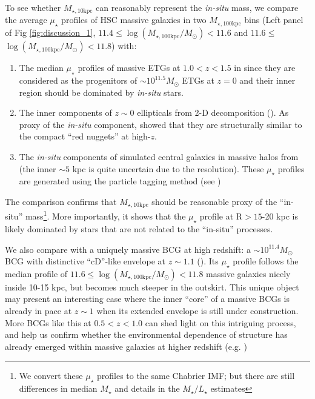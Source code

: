 \documentclass[a4paper,fleqn,usenatbib]{mnras}
\def\mstar{{$M_{\star}$}}
\def\minn{{$M_{\star,10\mathrm{kpc}}$}}
\def\mtot{{$M_{\star,100\mathrm{kpc}}$}}
\def\logmtot{{$\log (M_{\star,100\mathrm{kpc}}/M_{\odot})$}}
\def\m2l{{$M_{\star}/L_{\star}$}}
\def\mden{{$\mu_{\star}$}}
\begin{document}
    To see whether \minn{} can reasonably represent the \textit{in-situ} mass, we 
    compare the average \mden{} profiles of HSC massive galaxies in two \mtot{} 
    bins (Left panel of Fig \ref{fig:discussion_1}, 
    $11.4\leq$\logmtot{}$<11.6$ and $11.6\leq$\logmtot{}$<11.8$) with: 
    
    \begin{enumerate}
        
        \item The median \mden{} profiles of massive ETGs at $1.0 < z < 1.5$ in
            \citealt{Patel2013} since they are considered as the progenitors of 
            ${\sim} 10^{11.5} M_{\odot}$ ETGs at $z=0$ and their inner region 
            should be dominated by \textit{in-situ} stars. 
    
        \item The inner components of $z{\sim} 0$ ellipticals from 2-D 
            decomposition (\citealt{Huang2013a}).
            As proxy of the \textit{in-situ} component, \citet{Huang2013b} showed 
            that they are structurally similar to the compact ``red nuggets'' at 
            high-$z$. 
        
        \item The \textit{in-situ} components of simulated central galaxies in 
            massive halos from \citet{Cooper2013} (the inner ${\sim} 5$ kpc is 
            quite uncertain due to the resolution).  
            These \mden{} profiles are generated using the particle tagging 
            method (see \citealt{Cooper2010})
    
    \end{enumerate}

    
    The comparison confirms that \minn{} should be reasonable proxy of the 
    ``in-situ'' mass\footnote{We convert these \mden{} profiles to the same 
    Chabrier IMF; but there are still differences in median \mstar{} and 
    details in the \m2l{} estimates}.  
    More importantly, it shows that the \mden{} profile at 
    $\mathrm{R} > 15$-20 kpc is likely dominated by stars that are not related 
    to the ``in-situ'' processes.  
    
    We also compare with a uniquely massive BCG at high redshift: 
    a ${\sim} 10^{11.4} M_{\odot}$ BCG with distinctive ``cD''-like envelope at 
    $z{\sim} 1.1$ (\citealt{Liu2013}).  
    Its \mden{} profile follows the median profile of $11.6\leq$\logmtot{}$<11.8$ 
    massive galaxies nicely inside 10-15 kpc, but becomes much steeper in the outskirt.  
    This unique object may present an interesting case where the inner ``core'' of a 
    massive BCGs is already in pace at $z{\sim} 1$ when its extended envelope is still
    under construction.
    More BCGs like this at $0.5 < z < 1.0$ can shed light on this intriguing 
    process, and help us confirm whether the environmental dependence of structure 
    has already emerged within massive galaxies at higher redshift 
    (e.g. \citealt{Papovich2012})
\end{document}
